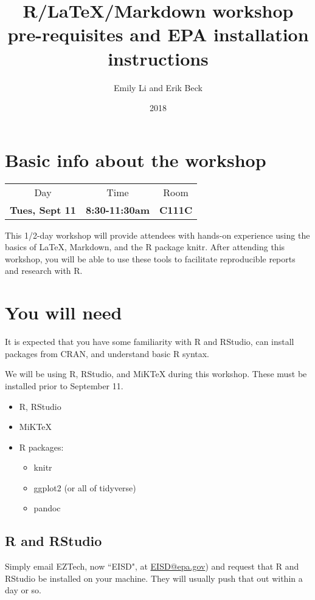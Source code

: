 \documentclass{article}
\title{R/LaTeX/Markdown workshop pre-requisites and EPA installation instructions}
\author{Emily Li and Erik Beck}
\date{2018}
\begin{document}
\maketitle
\tableofcontents

\section{Basic info about the workshop}
\begin{center}
    \begin{tabular}{c c c}
    Day & Time & Room \\
    \textbf{Tues, Sept 11} & \textbf{8:30-11:30am} & \textbf{C111C}
\end{tabular}
\end{center}

This 1/2-day workshop will provide attendees with hands-on experience
using the basics of LaTeX, Markdown, and the R package knitr. After
attending this workshop, you will be able to use these tools to
facilitate reproducible reports and research with R.

\section{You will need}
It is expected that you have some familiarity with R and RStudio, can
install packages from CRAN, and understand basic R syntax.

We will be using R, RStudio, and MiKTeX during this workshop. These must be installed prior to September 11.
\begin{itemize}
    \item R, RStudio
    \item MiKTeX
    \item R packages:
    \begin{itemize}
        \item knitr
        \item ggplot2 (or all of tidyverse)
        \item pandoc
    \end{itemize}
\end{itemize}

\subsection{R and RStudio}
Simply email EZTech, now ``EISD", at
\href{mailto:EISD@epa.gov}{EISD@epa.gov}) and request that R and
RStudio be installed on your machine. They will usually push that out
within a day or so.
\end{document}
